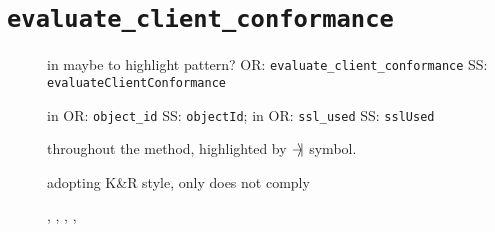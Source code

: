 	













































\clearpage%
\section{\normalfont\texttt{evaluate\_client\_conformance}}

\begin{description}
	\item [] 
		in  maybe to highlight pattern? 
			OR: \texttt{evaluate\_client\_conformance}
			SS: \texttt{evaluateClientConformance}
	\item [] 
		in  
			OR: \texttt{object\_id}
			SS: \texttt{objectId}; 
		in  
			OR: \texttt{ssl\_used}
			SS: \texttt{sslUsed}
	\item []
		throughout the method, highlighted by $-\hspace{-0.4em}\rangle\hspace{-0.2em}|$ symbol. %
	\item []
		adopting K\&R style, only  does not comply
	\item [] , , , , 

\end{description}















